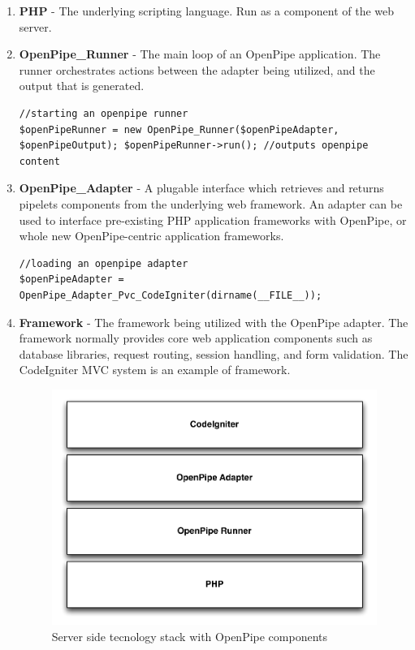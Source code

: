 \documentclass[12pt]{report}
\begin{document}
\begin{enumerate}
	\item \textbf{PHP} - The underlying scripting language. Run as a component of the web server.
	\item \textbf{OpenPipe\_Runner} - The main loop of an OpenPipe application. The runner orchestrates actions between the adapter being utilized, and the output that is generated.
		\begin{lstlisting}
//starting an openpipe runner
$openPipeRunner = new OpenPipe_Runner($openPipeAdapter, $openPipeOutput); $openPipeRunner->run(); //outputs openpipe content
		\end{lstlisting}

	\item \textbf{OpenPipe\_Adapter} - A plugable interface which retrieves and returns pipelets components from the underlying web framework. An adapter can be used to interface pre-existing PHP application frameworks with OpenPipe, or whole new OpenPipe-centric application frameworks.
		\begin{lstlisting}
//loading an openpipe adapter
$openPipeAdapter = OpenPipe_Adapter_Pvc_CodeIgniter(dirname(__FILE__));
		\end{lstlisting}	

	\item \textbf{Framework} - The framework being utilized with the OpenPipe adapter. The framework normally provides core web application components such as database libraries, request routing, session handling, and form validation. The CodeIgniter MVC system is an example of framework.
	
		\begin{figure}[H]
		\label{fig:frameworkStack}
		\centering
		\includegraphics[width=\textwidth,keepaspectratio]{figures/images/framework_stack.pdf}
		\caption{Server side tecnology stack with OpenPipe components}
		\end{figure}

\end{enumerate}
\end{document}
